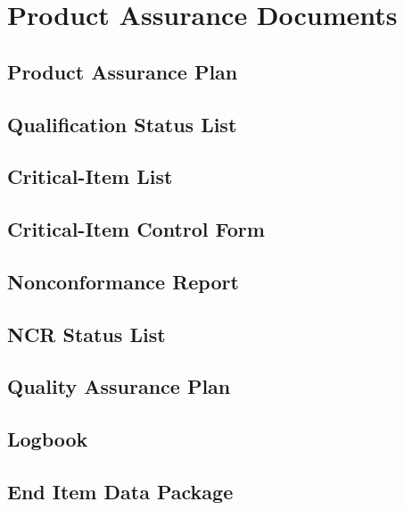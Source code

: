 \section{Product Assurance Documents}


\subsection{Product Assurance Plan}
\label{sec:Product Assurance Plan}


\subsection{Qualification Status List}
\label{sec:Qualification Status List}


\subsection{Critical-Item List}
\label{sec:Critical-Item List}


\subsection{Critical-Item Control Form}
\label{sec:Critical-Item Control Form}


\subsection{Nonconformance Report}
\label{sec:Nonconformance Report}


\subsection{NCR Status List}
\label{sec:NCR Status List}


\subsection{Quality Assurance Plan}
\label{sec:Quality Assurance Plan}


\subsection{Logbook}
\label{sec:Logbook}


\subsection{End Item Data Package}
\label{sec:End Item Data Package}


